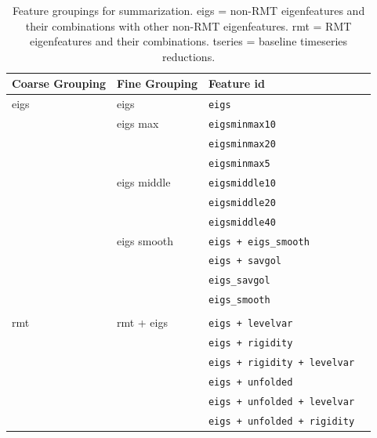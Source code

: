 \documentclass[12pt]{spieman}  %
\newcommand{\tcode}[1]{\footnotesize\texttt{#1}\normalsize}
\begin{document}
\begin{spacing}{2}
\begin{table}[h!]
\caption{
\label{tab:features}
Feature groupings for summarization. eigs = non-RMT eigenfeatures and their combinations with
other non-RMT eigenfeatures. rmt = RMT eigenfeatures and their combinations. tseries = baseline
timeseries reductions.\\
}
\small
\centering
\begin{tabular}{lllr}
\hline
\textbf{Coarse Grouping} & \textbf{Fine Grouping} & \textbf{Feature id}   \\
\hline
eigs           & eigs          & \tcode{eigs}                           \\
               & eigs max      & \tcode{eigsminmax10}                   \\
               &               & \tcode{eigsminmax20}                   \\
               &               & \tcode{eigsminmax5}                    \\
               & eigs middle   & \tcode{eigsmiddle10}                   \\
               &               & \tcode{eigsmiddle20}                   \\
               &               & \tcode{eigsmiddle40}                   \\
               & eigs smooth   & \tcode{eigs + eigs\_smooth}            \\
               &               & \tcode{eigs + savgol}                  \\
               &               & \tcode{eigs\_savgol}                   \\
               &               & \tcode{eigs\_smooth}                   \\
               &               &                                        \\
rmt            & rmt + eigs    & \tcode{eigs + levelvar}                \\
               &               & \tcode{eigs + rigidity}                \\
               &               & \tcode{eigs + rigidity + levelvar}     \\
               &               & \tcode{eigs + unfolded}                \\
               &               & \tcode{eigs + unfolded + levelvar}     \\
               &               & \tcode{eigs + unfolded + rigidity}     \\

\end{tabular}
\end{table}
\end{spacing}
\end{document}
